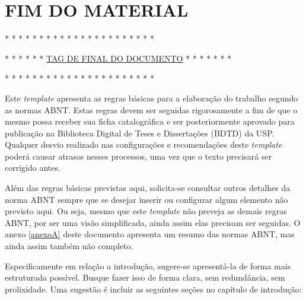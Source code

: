 \documentclass[
	12pt,				%
	oneside,			%
	a4paper,			%
	english,			%
	brazil				%
	]{abntex2ppgsi}
\begin{document}
\chapter{FIM DO MATERIAL}

* * * * * * * * * * * * * * * * * * * * * * 

* * * * * * \underline{TAG DE FINAL DO DOCUMENTO} * * * * * * *

* * * * * * * * * * * * * * * * * * * * * * 




Este \textit{template} apresenta as regras básicas para a elaboração do trabalho segundo as normas ABNT. Estas regras devem ser seguidas rigorosamente a fim de que o mesmo possa receber sua ficha catalográfica e ser posteriormente aprovado para publicação na Biblioteca Digital de Teses e Dissertações (BDTD) da USP. Qualquer desvio realizado nas configurações e recomendações deste \textit{template} poderá causar atrasos nesses processos, uma vez que o texto precisará ser corrigido antes. 

Além das regras básicas previstas aqui, solicita-se consultar outros detalhes da norma ABNT sempre que se desejar inserir ou configurar algum elemento não previsto aqui. Ou seja, mesmo que este \textit{template} não preveja as demais regras ABNT, por ser uma visão simplificada, ainda assim elas precisam ser seguidas. O anexo \ref{anexoA} deste documento apresenta um resumo das normas ABNT, mas ainda assim também não completo.



Especificamente em relação a introdução, sugere-se apresentá-la de forma mais estruturada possível. Busque fazer isso de forma clara, sem redundância, sem prolixidade. Uma sugestão é incluir as seguintes seções no capítulo de introdução:
\end{document}

